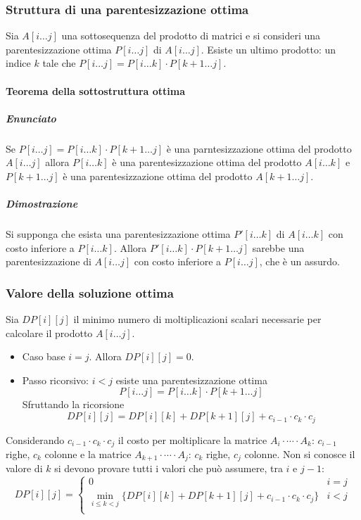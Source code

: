 \subsubsection{Struttura di una parentesizzazione ottima}
Sia $A[i\dots j]$ una sottosequenza del prodotto di matrici e si consideri una parentesizzazione ottima $P[i\dots j]$ di $A[i\dots j]$. Esiste un ultimo
prodotto: un indice $k$ tale che $P[i\dots j] = P[i\dots k]\cdot P[k+1\dots j]$.
\paragraph{Teorema della sottostruttura ottima}
\subparagraph{Enunciato}
Se $P[i\dots j]=P[i\dots k]\cdot P[k+1\dots j]$ \`e una parntesizzazione ottima del prodotto $A[i\dots j]$ allora $P[i\dots k]$ \`e una parentesizzazione
ottima del prodotto $A[i\dots k]$ e $P[k+1\dots j]$ \`e una parentesizzazione ottima del prodotto $A[k+1\dots j]$. 
\subparagraph{Dimostrazione}
Si supponga che esista una parentesizzazione ottima $P'[i\dots k]$ di $A[i\dots k]$ con costo inferiore a $P[i\dots k]$. Allora $P'[i\dots k]\cdot 
P[k+1\dots j]$ sarebbe una parentesizzazione di $A[i\dots j]$ con costo inferiore a $P[i\dots j]$, che \`e un assurdo. 
\subsubsection{Valore della soluzione ottima}
Sia $DP[i][j]$ il minimo numero di moltiplicazioni scalari necessarie per calcolare il prodotto $A[i\dots j]$. 
\begin{itemize}
	\item Caso base $i=j$. Allora $DP[i][j]=0$.
	\item Passo ricorsivo: $i<j$ esiste una parentesizzazione ottima $$P[i\dots j] = P[i\dots k]\cdot P[k+1\dots j]$$ Sfruttando la ricorsione 
		$$DP[i][j] = DP[i][k]+DP[k+1][j]+c_{i-1}\cdot c_k\cdot c_j$$
\end{itemize}
Considerando $c_{i-1}\cdot c_k\cdot c_j$ il costo per moltiplicare la matrice $A_i\cdot\cdots\cdot A_k$: $c_{i-1}$ righe, $c_k$ colonne e la matrice $A_{k+1}\cdot\cdots\cdot A_j$:
$c_k$ righe, $c_j$ colonne. Non si conosce il valore di $k$ si devono provare tutti i valori che pu\`o assumere, tra $i$ e $j-1$:
$$DP[i][j] = \begin{cases}
	0 & i = j\\
	\min\limits_{i\le k < j}\{DP[i][k]+DP[k+1][j]+c_{i-1}\cdot c_k\cdot c_j\} & i < j\\
\end{cases}$$
